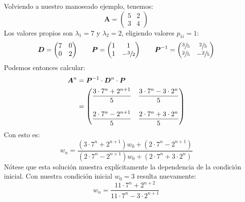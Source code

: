   Volviendo a nuestro manoseado ejemplo,
  tenemos:
  \begin{equation}
    \label{eq:Ricatti-ex-Moebius-A}
    \boldsymbol{A} =
    \begin{pmatrix}
      5 & 2 \\
      3 & 4
    \end{pmatrix}
  \end{equation}
  Los valores propios son \(\lambda_1 = 7\) y \(\lambda_2 = 2\),
  eligiendo valores \(p_{1 i} = 1\):
  \begin{equation}
    \label{eq:eq:Ricatti-ex-Moebius-P}
    \boldsymbol{D} =
    \begin{pmatrix}
	7  & 0 \\
	0  & 2
    \end{pmatrix} \qquad
    \boldsymbol{P} =
    \begin{pmatrix}
	1  & 1 \\
	1  & - \sfrac{3}{2}
    \end{pmatrix} \qquad
    \boldsymbol{P}^{-1} =
    \begin{pmatrix}
      \sfrac{3}{5} & \sfrac{2}{5} \\
      \sfrac{2}{5} & -\sfrac{2}{5}
    \end{pmatrix}
  \end{equation}
  Podemos entonces calcular:
  \begin{align}
    \boldsymbol{A}^n
     &= \boldsymbol{P}^{-1}
	  \cdot \boldsymbol{D}^n
	  \cdot \boldsymbol{P} \notag \\
     &=
     \begin{pmatrix}
       \displaystyle \frac{3 \cdot 7^n + 2^{n + 1}}{5} &
	 \displaystyle \frac{3 \cdot 7^n - 3 \cdot 2^n}{5} \\
       \\
       \displaystyle \frac{2 \cdot 7^n - 2^{n + 1}}{5} &
	 \displaystyle \frac{2 \cdot 7^n + 3 \cdot 2^n}{5}
     \end{pmatrix}
	\label{eq:Ricatti-ex-Moebius-An}
  \end{align}
  Con esto es:
  \begin{equation}
    \label{eq:Ricatti-ex-Moebius-sol-gral}
    w_n
      = \frac{(3 \cdot 7^n + 2^{n + 1}) w_0
		+ (2 \cdot 7^n - 2^{n + 1})}
	     {(2 \cdot 7^n - 2^{n + 1}) w_0
		+ (2 \cdot 7^n + 3 \cdot 2^n)}
  \end{equation}
  Nótese que esta solución muestra explícitamente la dependencia
  de la condición inicial.
  Con nuestra condición inicial \(w_0 = 3\) resulta nuevamente:
  \begin{equation}
    \label{eq:Ricatti-ex-Moebius-sol}
    w_n
      = \frac{11 \cdot 7^n + 2^{n + 2}}{11 \cdot 7^n - 3 \cdot 2^{n + 1}}
  \end{equation}

